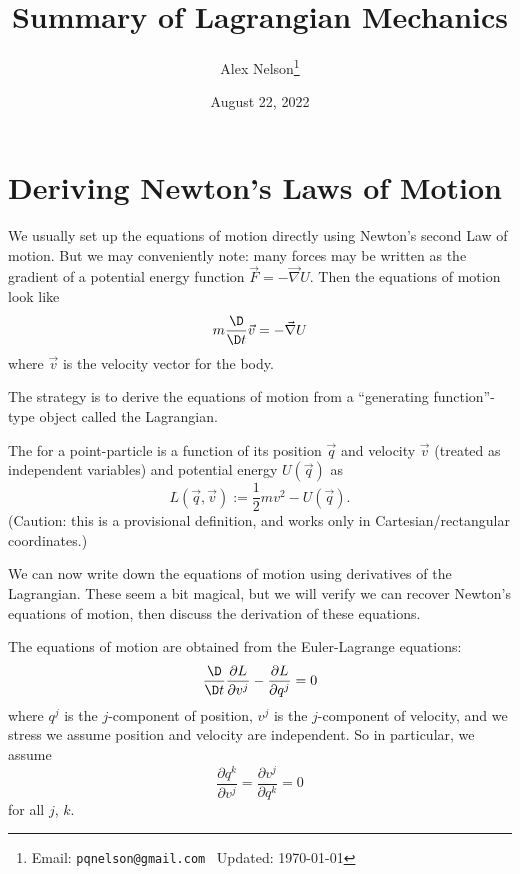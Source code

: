 \title{Summary of Lagrangian Mechanics}
\author{Alex Nelson\thanks{Email: \texttt{pqnelson@gmail.com}
\hfil\break\indent\;\, Updated: \today}}
\date{August 22, 2022}
\maketitle

\section{Deriving Newton's Laws of Motion}
\M
We usually set up the equations of motion directly using Newton's second
Law of motion. But we may conveniently note: many forces may be written
as the gradient of a potential energy function $\vec{F}=-\vec{\nabla}U$.
Then the equations of motion look like
\begin{equation}
m\frac{\D}{\D t}\vec{v} = -\vec{\nabla}U
\end{equation}
where $\vec{v}$ is the velocity vector for the body.

The strategy is to derive the equations of motion from a ``generating
function''-type object called the Lagrangian.

\begin{definition}
The  for a point-particle is a function of its
position $\vec{q}$ and velocity $\vec{v}$ (treated as independent
variables) and potential energy $U(\vec{q})$ as
\begin{equation}
L(\vec{q},\vec{v}) := \frac{1}{2}mv^{2} - U(\vec{q}).
\end{equation}
(Caution: this is a provisional definition, and works only in
Cartesian/rectangular coordinates.)
\end{definition}

We can now write down the equations of motion using derivatives of the
Lagrangian. These seem a bit magical, but we will verify we can recover
Newton's equations of motion, then discuss the derivation of these
equations.

The equations of motion are obtained from the Euler-Lagrange equations:
\begin{equation}
\frac{\D}{\D t}\frac{\partial L}{\partial v^{j}} - \frac{\partial L}{\partial q^{j}} = 0
\end{equation}
where $q^{j}$ is the $j$-component of position, $v^{j}$ is the
$j$-component of velocity, and we stress we assume position and velocity
are independent. So in particular, we assume
\begin{equation}
\frac{\partial q^{k}}{\partial v^{j}} = \frac{\partial v^{j}}{\partial q^{k}} = 0
\end{equation}
for all $j$, $k$.

